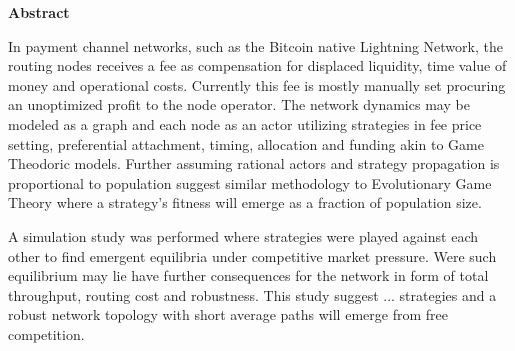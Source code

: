 \centering \textbf{Abstract}

In payment channel networks, such as the Bitcoin native Lightning Network, the routing
nodes receives a fee as compensation for displaced liquidity, time value of money and operational
costs. Currently this fee is mostly manually set procuring an unoptimized profit to
the node operator. The network dynamics may be modeled as a graph and each node as an actor
utilizing strategies in fee price setting, preferential attachment, timing, allocation and
funding akin to Game Theodoric models. Further assuming rational actors and strategy propagation is  
proportional to population suggest similar methodology to Evolutionary Game Theory where
a strategy's fitness will emerge as a fraction of population size.
		
A simulation study was performed where strategies were played against 
each other to find emergent equilibria under competitive market pressure. Were such
equilibrium may lie have further consequences for the network in form
of total throughput, routing cost and robustness. This study suggest 
... strategies and a robust network topology with short average paths 
will emerge from free competition.
		 
	
	